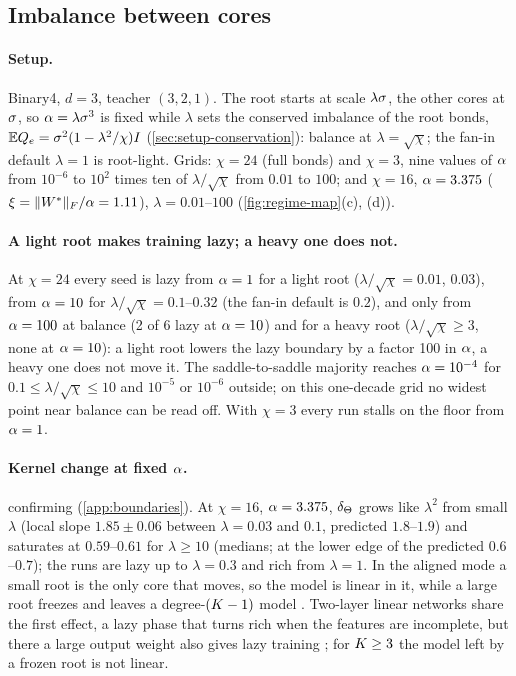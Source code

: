 \subsection{Imbalance between cores}\label{sec:regime-imbalance}

\paragraph{Setup.}
Binary4, $d=3$, teacher $(3,2,1)$. The root starts at scale $\lambda\sigma$, the other cores at $\sigma$, so
$\alpha=\lambda\sigma^3$ is fixed while $\lambda$ sets the conserved imbalance of the root bonds,
$\mathbb{E}Q_{e}=\sigma^2(1-\lambda^2/\chi)I$ (\cref{sec:setup-conservation}): balance at $\lambda=\sqrt\chi$; the fan-in
default $\lambda=1$ is root-light. Grids: $\chi=24$ (full bonds) and $\chi=3$, nine values of $\alpha$ from $10^{-6}$
to $10^2$ times ten of $\lambda/\sqrt\chi$ from $0.01$ to $100$; and $\chi=16$, $\alpha=3.375$
($\xi=\lVert W^{*}\rVert_{F}/\alpha=1.11$), $\lambda=0.01$--$100$ (\cref{fig:regime-map}(c), (d)).

\paragraph{A light root makes training lazy; a heavy one does not.}
\empirical{}  At $\chi=24$ every seed is lazy from $\alpha=1$ for a light root
($\lambda/\sqrt\chi=0.01$, $0.03$), from $\alpha=10$ for $\lambda/\sqrt\chi=0.1$--$0.32$ (the fan-in default is $0.2$),
and only from $\alpha=100$ at balance (2 of 6 lazy at $\alpha=10$) and for a heavy root ($\lambda/\sqrt\chi\ge3$, none
at $\alpha=10$): a light root lowers the lazy boundary by a factor 100 in $\alpha$, a heavy one does not move it. The
saddle-to-saddle majority reaches $\alpha=10^{-4}$ for $0.1\le\lambda/\sqrt\chi\le10$ and $10^{-5}$ or $10^{-6}$
outside; on this one-decade grid no widest point near balance can be read off. With $\chi=3$ every run stalls on
the floor from $\alpha=1$.

\paragraph{Kernel change at fixed $\alpha$.}
\empirical{} confirming \derived{} (\cref{app:boundaries}). At $\chi=16$, $\alpha=3.375$, $\delta_{\Theta}$ grows like $\lambda^2$
from small $\lambda$ (local slope $1.85\pm0.06$ between $\lambda=0.03$ and $0.1$, predicted $1.8$--$1.9$) and
saturates at $0.59$--$0.61$ for $\lambda\ge10$ (medians; at the lower edge of the predicted $0.6$--$0.7$); the runs
are lazy up to $\lambda=0.3$ and rich from $\lambda=1$. In the aligned mode a small root is the only core that
moves, so the model is linear in it, while a large root freezes and leaves a degree-$(K-1)$ model \derived.
Two-layer linear networks share the first effect, a lazy phase that turns rich when the features are
incomplete, but there a large output weight also gives lazy training
; for $K\ge3$ the model left by a frozen root is not linear.
